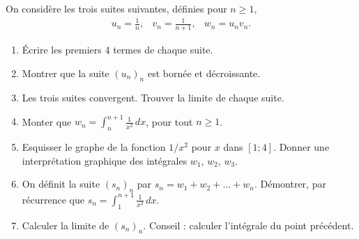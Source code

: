 
\begin{exercice}\label{exoExamenDecembre2010-0003}

On considère les trois suites suivantes, définies pour $n\geq 1$, 
\begin{equation}\nonumber
  \begin{array}{ccc}
   \displaystyle  u_n=\frac{1}{n}, &\displaystyle  v_n=\frac{1}{n+1}, & \displaystyle w_n=u_nv_n.
  \end{array}
\end{equation}
\begin{enumerate}
\item Écrire les premiers 4 termes de chaque suite.
\item Montrer que la suite $(u_n)_n$ est bornée et décroissante.  
\item Les trois suites convergent. Trouver la limite de chaque suite.
\item Monter que $\displaystyle w_n=\int_{n}^{n+1}\frac{1}{x^2}\, dx$, pour tout $n\geq 1$.
\item Esquisser le graphe de la fonction $1/x^2$ pour $x$ dans $[1;4]$. Donner une interprétation graphique des intégrales  $w_1$, $w_2$, $w_3$. 
\item On définit la suite $(s_n)_n$ par $s_n= w_1+w_2+\ldots+ w_n$. Démontrer, par récurrence que $s_n=\int_{1}^{n+1}\frac{1}{x^2}\,dx$.
\item Calculer la limite de $(s_n)_n$. Conseil : calculer l'intégrale du point précédent.  
\end{enumerate}

\end{exercice}
